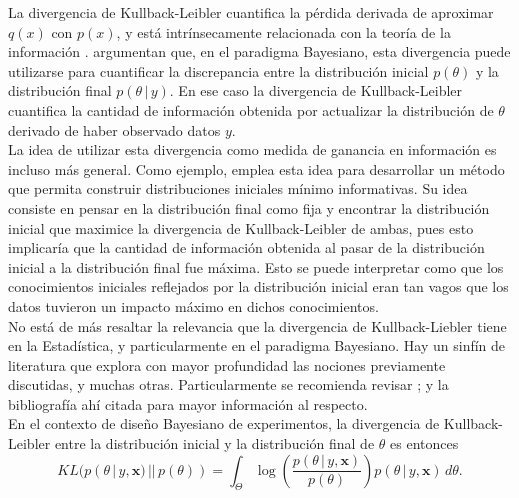 

La divergencia de Kullback-Leibler cuantifica la pérdida derivada de aproximar $q(x)$ con $p(x)$, y está intrínsecamente relacionada con la teoría de la información \citep{kullback_leibler}. \citet[Capítulos~2.7.3 y 2.7.4]{bernardo_smith} argumentan que, en el paradigma Bayesiano, esta divergencia puede utilizarse para cuantificar la discrepancia entre la distribución inicial $p(\theta)$ y la distribución final $p(\theta \, | \, y)$. En ese caso la divergencia de Kullback-Leibler cuantifica la cantidad de información obtenida por actualizar la distribución de $\theta$ derivado de haber observado datos $y$. \\

La idea de utilizar esta divergencia como medida de ganancia en información es incluso más general. Como ejemplo, \cite{bernardo_referenceposteriors} emplea esta idea para desarrollar un método que permita construir distribuciones iniciales mínimo informativas. Su idea consiste en pensar en la distribución final como fija y encontrar la distribución inicial que maximice la divergencia de Kullback-Leibler de ambas, pues esto implicaría que la cantidad de información obtenida al pasar de la distribución inicial a la distribución final fue máxima. Esto se puede interpretar como que los conocimientos iniciales reflejados por la distribución inicial eran tan vagos que los datos tuvieron un impacto máximo en dichos conocimientos. \\


No está de más resaltar la relevancia que la divergencia de Kullback-Liebler tiene en la Estadística, y particularmente en el paradigma Bayesiano. Hay un sinfín de literatura que explora con mayor profundidad las nociones previamente discutidas, y muchas otras. Particularmente se recomienda revisar \cite{bernardo_informationasutility}; \cite{bernardo_referenceposteriors, bernardo_smith, kullback_leibler} y la bibliografía ahí citada para mayor información al respecto. \\

En el contexto de diseño Bayesiano de experimentos, la divergencia de Kullback-Leibler entre la distribución inicial y la distribución final de $\theta$ es entonces
\begin{equation} \label{eq:KLdivergence2}
	KL(p(\theta \, | \, y, \mathbf{x}) \, || \, p(\theta)) = \int_{\Theta} \log \left( \frac{p(\theta \, | \, y, \mathbf{x})}{p(\theta)} \right) p( \theta \, | \, y, \mathbf{x} ) \, d\theta.
\end{equation}

